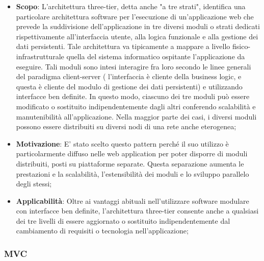 		
		\begin{itemize}
			\item \textbf{Scopo}: L'architettura three-tier, detta anche "a tre strati", identifica una particolare architettura software per l'esecuzione di un'applicazione web che prevede la suddivisione dell'applicazione in tre diversi moduli o strati dedicati rispettivamente all'interfaccia utente, alla logica funzionale e alla gestione dei dati persistenti. Tale architettura va tipicamente a mappare a livello fisico-infrastrutturale quella del sistema informatico ospitante l'applicazione da eseguire.
Tali moduli sono intesi interagire fra loro secondo le linee generali del paradigma client-server ( l'interfaccia è cliente della business logic, e questa è cliente del modulo di gestione dei dati persistenti) e utilizzando interfacce ben definite. In questo modo, ciascuno dei tre moduli può essere modificato o sostituito indipendentemente dagli altri conferendo scalabilità e manutenibilità all'applicazione. Nella maggior parte dei casi, i diversi moduli possono essere distribuiti su diversi nodi di una rete anche eterogenea;
			
			\item \textbf{Motivazione}: E' stato scelto questo pattern perché il suo utilizzo è particolarmente diffuso nelle web application per poter disporre di moduli distribuiti, posti su piattaforme separate. Questa separazione aumenta le prestazioni e la scalabilità, l'estensibilità dei moduli e lo sviluppo parallelo degli stessi;
			
			\item \textbf{Applicabilità}: Oltre ai vantaggi abituali nell'utilizzare software modulare con interfacce ben definite, l'architettura three-tier consente anche a qualsiasi dei tre livelli di essere aggiornato o sostituito indipendentemente dal cambiamento di requisiti o tecnologia nell'applicazione;
			
		\end{itemize}


		\newpage
		\subsubsection{MVC} %
		
